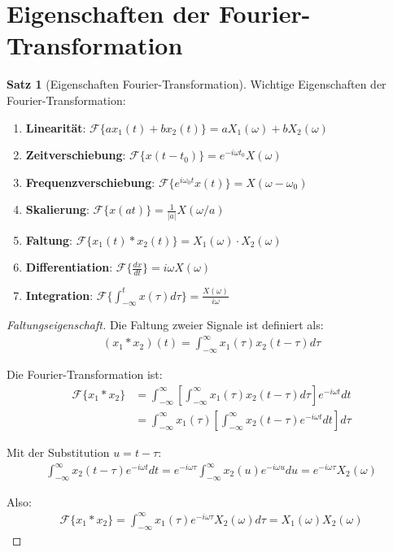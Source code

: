 ﻿\documentclass[a4paper,12pt]{report}
\theoremstyle{definition}
\newtheorem{satz}{Satz}
\begin{document}
	\section{Eigenschaften der Fourier-Transformation}
	
	\begin{satz}[Eigenschaften Fourier-Transformation]
		Wichtige Eigenschaften der Fourier-Transformation:
		\begin{enumerate}
			\item[-] \textbf{Linearität}: $\mathcal{F}\{a x_1(t) + b x_2(t)\} = a X_1(\omega) + b X_2(\omega)$
			
			\item[-] \textbf{Zeitverschiebung}: $\mathcal{F}\{x(t-t_0)\} = e^{-i\omega t_0} X(\omega)$
			
			\item[-] \textbf{Frequenzverschiebung}: $\mathcal{F}\{e^{i\omega_0 t} x(t)\} = X(\omega - \omega_0)$
			
			\item[-] \textbf{Skalierung}: $\mathcal{F}\{x(at)\} = \frac{1}{|a|} X(\omega/a)$
			
			\item[-] \textbf{Faltung}: $\mathcal{F}\{x_1(t) * x_2(t)\} = X_1(\omega) \cdot X_2(\omega)$
			
			\item[-] \textbf{Differentiation}: $\mathcal{F}\{\frac{dx}{dt}\} = i\omega X(\omega)$
			
			\item[-] \textbf{Integration}: $\mathcal{F}\{\int_{-\infty}^t x(\tau) d\tau\} = \frac{X(\omega)}{i\omega}$
		\end{enumerate}
	\end{satz}
	
	\begin{proof}[Faltungseigenschaft]
		Die Faltung zweier Signale ist definiert als:
		\begin{align}
			(x_1 * x_2)(t) = \int_{-\infty}^{\infty} x_1(\tau) x_2(t-\tau) d\tau
		\end{align}
		
		Die Fourier-Transformation ist:
		\begin{align}
			\mathcal{F}\{x_1 * x_2\} &= \int_{-\infty}^{\infty} \left[\int_{-\infty}^{\infty} x_1(\tau) x_2(t-\tau) d\tau\right] e^{-i\omega t} dt \\
			&= \int_{-\infty}^{\infty} x_1(\tau) \left[\int_{-\infty}^{\infty} x_2(t-\tau) e^{-i\omega t} dt\right] d\tau
		\end{align}
		
		Mit der Substitution $u = t - \tau$:
		\begin{align}
			\int_{-\infty}^{\infty} x_2(t-\tau) e^{-i\omega t} dt = e^{-i\omega\tau} \int_{-\infty}^{\infty} x_2(u) e^{-i\omega u} du = e^{-i\omega\tau} X_2(\omega)
		\end{align}
		
		Also:
		\begin{align}
			\mathcal{F}\{x_1 * x_2\} = \int_{-\infty}^{\infty} x_1(\tau) e^{-i\omega\tau} X_2(\omega) d\tau = X_1(\omega) X_2(\omega)
		\end{align}
	\end{proof}
	
\end{document}
